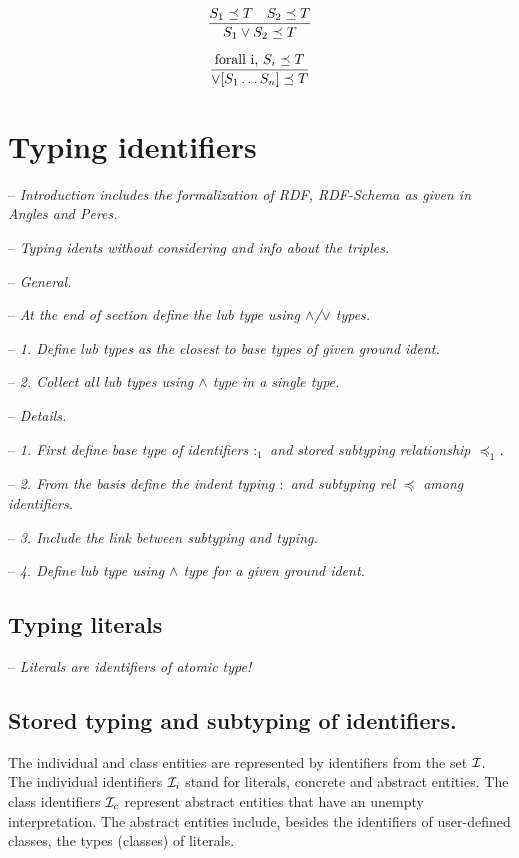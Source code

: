\documentclass[runningheads]{llncs}
\newcommand{\I}{{\cal I}}
\newcommand{\Ii}{{\cal I}_i}
\newcommand{\Ic}{{\cal I}_c}
\newcommand{\nl}{\hfill\break}
\newcommand{\notes}[1]{\noindent\begin{small}-- \emph{#1}\\\end{small}}
\begin{document}
\begin{equation}
\dfrac{S_1\preceq\/T\quad\/S_2\preceq\/\/T}
      {S_1\lor\/S_2\preceq\/T}  
\end{equation}

\begin{equation}
\dfrac{\text{forall i,\ } S_i\preceq\/T}
      {\lor[S_1\ldots\/S_n]\preceq\/T}  
\end{equation}






\section{Typing identifiers}

\notes{Introduction includes the formalization of RDF, RDF-Schema as given in Angles and Peres.}
\notes{Typing idents without considering and info about the triples.}

\notes{General.}
\notes{At the end of section define the lub type using $\land$/$\lor$ types.}
\notes{1. Define lub types as the closest to base types of given ground ident.}
\notes{2. Collect all lub types using $\land$ type in a single type.}

\notes{Details.}
\notes{1. First define base type of identifiers $:_1$ and stored subtyping relationship $\preceq_1$.}
\notes{2. From the basis define the indent typing $:$ and subtyping rel $\preceq$ among identifiers.}
\notes{3. Include the link between subtyping and typing.}
\notes{4. Define lub type using $\land$ type for a given ground ident.}




\subsection{Typing literals}

\notes{Literals are identifiers of atomic type!}





\subsection{Stored typing and subtyping of identifiers.}\nl

The individual and class entities are represented by identifiers from
the set $\I$. The individual identifiers $\Ii$ stand for literals,
concrete and abstract entities. The class identifiers $\Ic$ represent
abstract entities that have an unempty interpretation. The abstract
entities include, besides the identifiers of user-defined classes,
the types (classes) of literals.
\end{document}
